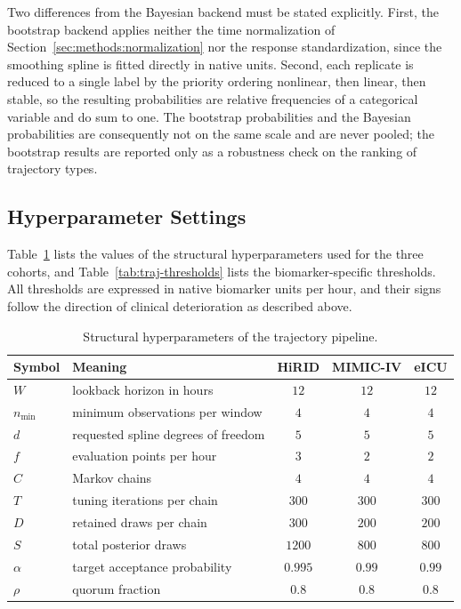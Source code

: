 Two differences from the Bayesian backend must be stated explicitly. First, the bootstrap backend applies neither the time normalization of Section~\ref{sec:methods:normalization} nor the response standardization, since the smoothing spline is fitted directly in native units. Second, each replicate is reduced to a single label by the priority ordering nonlinear, then linear, then stable, so the resulting probabilities are relative frequencies of a categorical variable and do sum to one. The bootstrap probabilities and the Bayesian probabilities are consequently not on the same scale and are never pooled; the bootstrap results are reported only as a robustness check on the ranking of trajectory types.

\subsection{Hyperparameter Settings}
\label{sec:methods:hyperparameters}

Table~\ref{tab:traj-hyperparams} lists the values of the structural hyperparameters used for the three cohorts, and Table~\ref{tab:traj-thresholds} lists the biomarker-specific thresholds. All thresholds are expressed in native biomarker units per hour, and their signs follow the direction of clinical deterioration as described above.

\begin{table}[t]
\centering
\caption{Structural hyperparameters of the trajectory pipeline.}
\label{tab:traj-hyperparams}
\begin{tabular}{llccc}
\toprule
Symbol & Meaning & HiRID & MIMIC-IV & eICU \\
\midrule
$W$ & lookback horizon in hours & $12$ & $12$ & $12$ \\
$n_{\min}$ & minimum observations per window & $4$ & $4$ & $4$ \\
$d$ & requested spline degrees of freedom & $5$ & $5$ & $5$ \\
$f$ & evaluation points per hour & $3$ & $2$ & $2$ \\
$C$ & Markov chains & $4$ & $4$ & $4$ \\
$T$ & tuning iterations per chain & $300$ & $300$ & $300$ \\
$D$ & retained draws per chain & $300$ & $200$ & $200$ \\
$S$ & total posterior draws & $1200$ & $800$ & $800$ \\
$\alpha$ & target acceptance probability & $0.995$ & $0.99$ & $0.99$ \\
$\rho$ & quorum fraction & $0.8$ & $0.8$ & $0.8$ \\
\bottomrule
\end{tabular}
\end{table}

